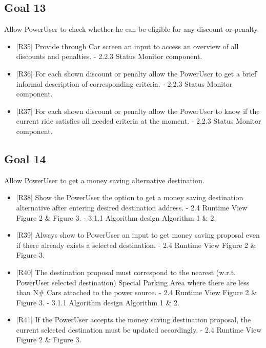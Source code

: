 \subsection {Goal 13} Allow PowerUser to check whether he can be eligible for any discount or penalty.
\begin{itemize}
 \item |R35| Provide through Car screen an input to access an overview of all discounts
and penalties.
    \newline - 2.2.3 Status Monitor component.
 \item |R36| For each shown discount or penalty allow the PowerUser to get a brief informal
description of corresponding criteria.
    \newline - 2.2.3 Status Monitor component.
 \item |R37| For each shown discount or penalty allow the PowerUser to know if the current
ride satisfies all needed criteria at the moment.
    \newline - 2.2.3 Status Monitor component.
\end{itemize}

\subsection {Goal 14} Allow PowerUser to get a money saving alternative destination.
\begin{itemize}
 \item |R38| Show the PowerUser the option to get a money saving destination alternative
after entering desired destination address.
    \newline - 2.4 Runtime View Figure 2 \& Figure 3.
    \newline - 3.1.1 Algorithm design Algorithm 1 \& 2.    
 \item |R39| Always show to PowerUser an input to get money saving proposal even if
there already exists a selected destination.
    \newline - 2.4 Runtime View Figure 2 \& Figure 3.
 \item |R40| The destination proposal must correspond to the nearest (w.r.t. PowerUser
selected destination) Special Parking Area where there are less than N\# Cars
attached to the power source.
    \newline - 2.4 Runtime View Figure 2 \& Figure 3.
    \newline - 3.1.1 Algorithm design Algorithm 1 \& 2. 
 \item |R41| If the PowerUser accepts the money saving destination proposal, the current
selected destination must be updated accordingly.
    \newline - 2.4 Runtime View Figure 2 \& Figure 3.
\end{itemize}

